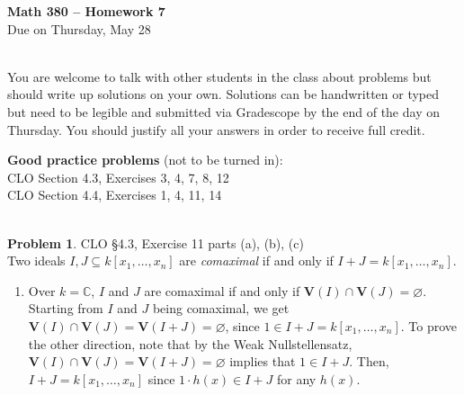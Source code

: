 \documentclass[12pt]{amsart}
\theoremstyle{definition}
\newtheorem{prob}{Problem}
\begin{document}
 \thispagestyle{empty}
\begin{center} {\large \textbf{Math 380 -- Homework  7}} \smallskip \\ 
Due on Thursday, May 28\ \\ \ \\
 \end{center}

You are welcome to talk with other students in the class about problems but should write up solutions on your own. 
Solutions can be handwritten or typed but need to be legible and submitted via Gradescope by the end of the day 
on Thursday. You should justify all your answers in order to receive full credit.  
\begin{flushleft}

{\bf Good practice problems} (not to be turned in): \\
CLO Section 4.3, Exercises 3, 4, 7, 8, 12 \\
CLO Section 4.4, Exercises 1, 4, 11, 14\\
\

\begin{prob} CLO \S4.3, Exercise 11 parts (a), (b), (c) \smallskip  \\
Two ideals $I, J \subseteq k[x_1,\dots,x_n]$ are \emph{comaximal} if and only if $I + J = k[x_1,\dots,x_n]$.
\begin{enumerate}
    \item[(a)] Over $k = \mathbb C$, $I$ and $J$ are comaximal if and only if $\mathbf V(I)\cap \mathbf V(J) = \varnothing$. Starting from $I$ and $J$ being comaximal, we get $\mathbf V(I) \cap \mathbf V(J) = \mathbf V(I+J) = \varnothing$, since $1 \in I + J = k[x_1,\dots,x_n]$. To prove the other direction, note that by the Weak Nullstellensatz, $\mathbf V(I)\cap \mathbf V(J) = \mathbf V(I+J)=\varnothing$ implies that $1 \in I+J$. Then, $I + J = k[x_1,\dots,x_n]$ since $1\cdot h(x) \in I+J$ for any $h(x)$.


\end{enumerate}
\end{prob}
\end{flushleft}
\end{document}
